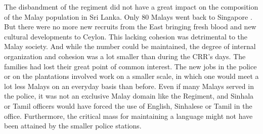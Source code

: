 


 
The disbandment of the regiment did not have a great impact on the composition of the Malay population in Sri Lanka.  Only 80 Malays went back to Singapore \citep[104]{Hussainmiya1990}. But there were no more new recruits from the East bringing fresh blood and new cultural developments to Ceylon.  This lacking cohesion was detrimental to the Malay society. And while the number could be maintained, the degree of internal organization and cohesion was a lot smaller than during the CRR's days. The families had lost their great point of common interest. The new jobs in the police or on the plantations involved work on a smaller scale, in which one would meet a lot less Malays on an everyday basis than before.
Even if many Malays served in the police, it was not an exclusive Malay domain like the Regiment, and Sinhala or Tamil officers would have forced the use of English, Sinhalese or Tamil in the office. Furthermore, the critical mass for maintaining a language might not have been attained by the smaller police stations.

 
